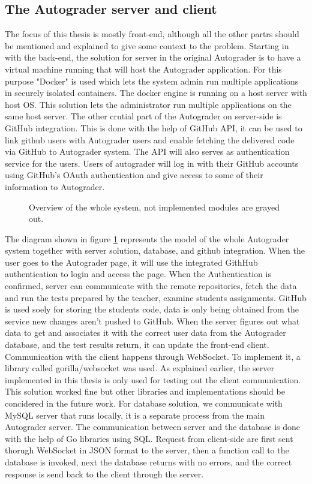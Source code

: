 \subsection{The Autograder server and client}
The focus of this thesis is mostly front-end, although all the other partrs should be mentioned and explained to give some context to the problem. Starting in with the back-end, the solution for server in the original Autograder is to have a virtual machine running that will host the Autograder application. For this purpose "Docker" \cite{docker} is used which lets the system admin run multiple applications in securely isolated containers. The docker engine is running on a host server with host OS. This solution lets the administrator run multiple applications on the same host server. The other crutial part of the Autograder on server-side is GitHub integration. This is done with the help of GitHub API, it can be used to link github users with Autograder users and enable fetching the delivered code via GitHub to Autograder system. The API will also serves as authentication service for the users. Users of autograder will log in with their GitHub accounts using GitHub's OAuth authentication \cite{githuboauth} and give access to some of their information to Autograder.

\begin{figure}[h]
  \scalebox{1}{}
  \caption{Overview of the whole system, not implemented modules are grayed out.}
  \label{fig:systemoverview}
\end{figure}

The diagram shown in figure \ref{fig:systemoverview} represents the model of the whole Autograder system together with server solution, database, and github integration. When the user goes to the Autograder page, it will use the integrated GithHub authentication to login and access the page. When the Authentication is confirmed, server can communicate with the remote repositories, fetch the data and run the tests prepared by the teacher, examine students assignments. GitHub is used soely for storing the students code, data is only being obtained from the service new changes aren't pushed to GitHub. When the server figures out what data to get and associates it with the correct user data from the Autograder database, and the test results return, it can update the front-end client.
\\Communication with the client happens through WebSocket. To implement it, a library called gorilla/websocket \cite{gorilla} was used. As explained earlier, the server implemented in this thesis is only used for testing out the client communication. This solution worked fine but other libraries and implementations should be concidered in the future work. For database solution, we communicate with MySQL server that runs locally, it is a separate process from the main Autograder server. The communication between server and the database is done with the help of Go libraries using SQL. Request from client-side are first sent thorugh WebSocket in JSON format to the server, then a function call to the database is invoked, next the database returns with no errors, and the correct response is send back to the client through the server.  

